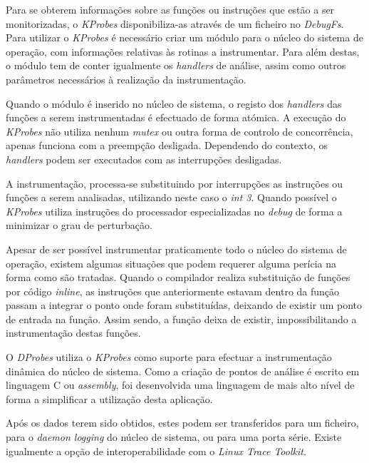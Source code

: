 Para se obterem informações sobre as funções ou instruções que estão a ser monitorizadas, o \textit{KProbes} disponibiliza-as através de um ficheiro no \textit{DebugFs}.
Para utilizar o \textit{KProbes} é necessário criar um módulo para o núcleo do sistema de operação, com informações relativas às rotinas a instrumentar.
Para além destas, o módulo tem de conter igualmente os \textit{handlers} de análise, assim como outros parâmetros necessários à realização da instrumentação.

Quando o módulo é inserido no núcleo de sistema, o registo dos \textit{handlers} das funções a serem instrumentadas é efectuado de forma atómica.
A execução do \textit{KProbes} não utiliza nenhum \textit{mutex} ou outra forma de controlo de concorrência, apenas funciona com a preempção desligada.
Dependendo do contexto, os \textit{handlers} podem ser executados com as interrupções desligadas.

A instrumentação, processa-se substituindo por interrupções as instruções ou funções a serem analisadas, utilizando neste caso o \textit{int 3}.
Quando possível o \textit{KProbes} utiliza instruções do processador especializadas no \textit{debug} de forma a minimizar o grau de perturbação.

Apesar de ser possível instrumentar praticamente todo o núcleo do sistema de operação, existem algumas situações que podem requerer alguma perícia na forma como são tratadas.
Quando o compilador realiza substituição de funções por código \textit{inline}, as instruções que anteriormente estavam dentro da função passam a integrar o ponto onde foram substituídas, deixando de existir um ponto de entrada na função.
Assim sendo, a função deixa de existir, impossibilitando a instrumentação destas funções.


O \textit{DProbes} utiliza o \textit{KProbes} como suporte para efectuar a instrumentação dinâmica do núcleo de sistema.
Como a criação de pontos de análise é escrito em linguagem C ou \textit{assembly}, foi desenvolvida uma linguagem de mais alto nível de forma a simplificar a utilização desta aplicação.

Após os dados terem sido obtidos, estes podem ser transferidos para um ficheiro, para o \textit{daemon logging} do núcleo de sistema, ou para uma porta série.
Existe igualmente a opção de interoperabilidade com o \textit{Linux Trace Toolkit}\cite{:DProbes}.

